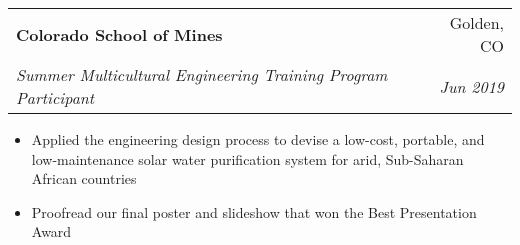 \documentclass[letterpaper,20pt]{article}
\makeatletter
\newcommand{\resumeItemWithoutTitle}[1]{

  \item{
  }
  \vspace{-5pt}
}
\newcommand{\resumeSubheading}[4]{
  
  \vspace{2pt}
    \begin{tabular*}{0.97\textwidth}{l@{\extracolsep{\fill}}r}
      \textbf{#1} & #2 \\
      \textit{#3} & \textit{#4} \\
    \end{tabular*}\vspace{5pt}
}
\newcommand{\resumeItemListStart}{\begin{itemize}\vspace{-5pt}}
\newcommand{\resumeItemListEnd}{\end{itemize}}
\makeatother
\begin{document}
\vspace{-5pt}
    \resumeSubheading
		{Colorado School of Mines}{Golden, CO}
		{Summer Multicultural Engineering Training Program Participant}{Jun 2019}
		\resumeItemListStart
        \resumeItemWithoutTitle{}
          {Applied the engineering design process to devise a low-cost, portable, and low-maintenance solar water purification system for arid, Sub-Saharan African countries}
        \resumeItemWithoutTitle{}
        {Proofread our final poster and slideshow that won the Best Presentation Award}
		\resumeItemListEnd
\end{document}
